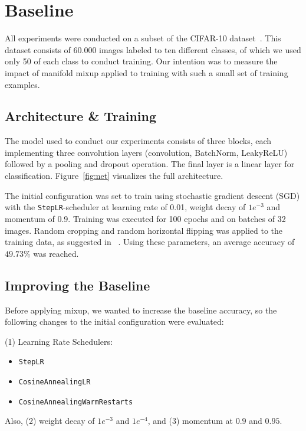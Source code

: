 \section{Baseline}
\label{sec:baseline}

All experiments were conducted on a subset of the CIFAR-10 dataset~\cite{krizh09}. This dataset consists of 60.000 images labeled to ten different classes, of which we used only 50 of each class to conduct training. Our intention was to measure the impact of manifold mixup applied to training with such a small set of training examples.

\subsection{Architecture \& Training}

The model used to conduct our experiments consists of three blocks, each implementing three convolution layers (convolution, BatchNorm, LeakyReLU) followed by a pooling and dropout operation. The final layer is a linear layer for classification. Figure~\ref{fig:net} visualizes the full architecture.

\twocolumn

The initial configuration was set to train using stochastic gradient descent (SGD) with the \texttt{StepLR}-scheduler at learning rate of 0.01, weight decay of $1e^{-3}$ and momentum of 0.9. Training was executed for 100 epochs and on batches of 32 images. Random cropping and random horizontal flipping was applied to the training data, as suggested in ~\cite{goyal17}. Using these parameters, an average accuracy of $49.73\%$ was reached.

\subsection{Improving the Baseline}

Before applying mixup, we wanted to increase the baseline accuracy, so the following changes to the initial configuration were evaluated:

(1) Learning Rate Schedulers:\\[-1.5em]
\begin{itemize}
 \setlength\itemsep{-.5em}
    \item \texttt{StepLR}
    \item \texttt{CosineAnnealingLR}\\ \cite{cosannlr}
    \item \texttt{CosineAnnealingWarmRestarts}\\ \cite{cosannlr}
\end{itemize}
Also, (2) weight decay of $1e^{-3}$ and $1e^{-4}$, and (3) momentum at $0.9$ and $0.95$.

